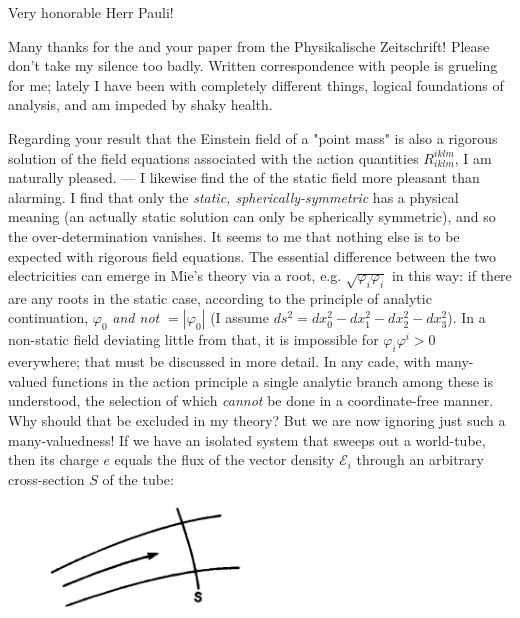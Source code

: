 \begin{letter}{2}
\begin{header}
\date{1919/12/09}

\makeheader

\end{header}

Very honorable Herr Pauli!

Many thanks for the  and your paper from the Physikalische Zeitschrift! Please don't take my silence too badly. Written correspondence with people is grueling for me; lately I have been with completely different things, logical foundations of analysis, and am impeded by shaky health.

Regarding your result that the Einstein field of a "point mass" is also a rigorous solution of the field equations associated with the action quantities $R_{iklm}^{iklm}$, I am naturally pleased. — I likewise find the  of the static field more pleasant than alarming. I find that only the \textit{static, spherically-symmetric} has a physical meaning (an actually static solution can only be spherically symmetric), and so the over-determination vanishes. It seems to me that nothing else is to be expected with rigorous field equations. The essential difference between the two electricities can emerge in Mie's theory via a root, e.g. $\sqrt{\varphi_i \varphi_i}$ in this way: if there are any roots in the static case, according to the principle of analytic continuation, $\varphi_0$ \textit{and not $=|\varphi_0|$} (I assume $ds^2 = dx_0^2 - dx_1^2 - dx_2^2 - dx_3^2$). In a non-static field deviating little from that, it is impossible for $\varphi_i\varphi^i >0$ everywhere; that must be discussed in more detail. In any cade, with many-valued functions in the action principle a single analytic branch among these is understood, the selection of which \textit{cannot} be done in a coordinate-free manner. Why should that be excluded in my theory? But we are now ignoring just such a many-valuedness! If we have an isolated system that sweeps out a world-tube, then its charge $e$ equals the flux of the vector density $\mathcal{E}_i$ through an arbitrary cross-section $S$ of the tube:


\begin{figure}[h]
	\begin{center}
	\includegraphics[width=150pt]{02-19191209-01}
	\end{center}
\end{figure}


\end{letter}
